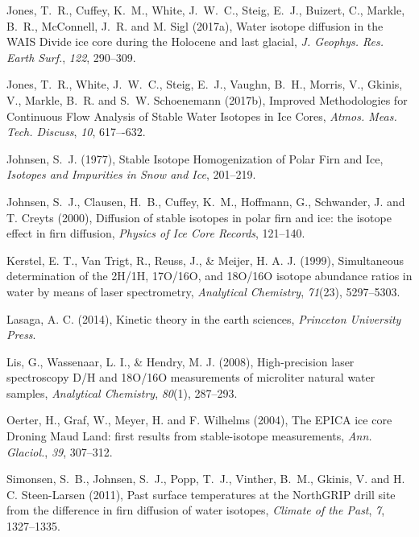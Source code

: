 \documentclass[draft, jgrga]{AGUTeX}
\begin{document}
\begin{article}
\begin{thebibliography}{}
Jones, T.~R., Cuffey, K.~M., White, J.~W.~C., Steig, E.~J., Buizert, C.,
Markle, B.~R., McConnell, J.~R. and M. Sigl (2017a),
{Water isotope diffusion in the WAIS Divide ice core
	during the Holocene and last glacial},
\textit{J. Geophys. Res. Earth Surf.}, \textit{122}, 290–309.

Jones, T.~R., White, J.~W.~C., Steig, E.~J., Vaughn, B.~H., Morris, V.,
Gkinis, V., Markle, B.~R. and S.~W. Schoenemann (2017b),
{Improved Methodologies for Continuous Flow Analysis of Stable
Water Isotopes in Ice Cores},
\textit{Atmos. Meas. Tech. Discuss}, \textit{10}, 617–-632.

Johnsen, S.~J. (1977),
{Stable Isotope Homogenization of Polar Firn and Ice},
\textit{Isotopes and Impurities in Snow and Ice}, 201--219.

Johnsen, S.~J., Clausen, H.~B., Cuffey, K.~M., Hoffmann, G., Schwander, J. and T. Creyts (2000),
{Diffusion of stable isotopes in polar firn and ice: the isotope effect in firn diffusion},
\textit{Physics of Ice Core Records}, 121--140.

Kerstel, E. T., Van Trigt, R., Reuss, J., & Meijer, H. A. J. (1999),
{Simultaneous determination of the 2H/1H, 17O/16O, and 18O/16O isotope abundance ratios in water by means of laser spectrometry},
\textit{Analytical Chemistry}, \textit{71}(23), 5297--5303.

Lasaga, A. C. (2014),
{Kinetic theory in the earth sciences},
\textit{Princeton University Press}.

Lis, G., Wassenaar, L. I., & Hendry, M. J. (2008),
{High-precision laser spectroscopy D/H and 18O/16O measurements of microliter natural water samples},
\textit{Analytical Chemistry}, \textit{80}(1), 287--293.

Oerter, H., Graf, W., Meyer, H. and F. Wilhelms (2004),
{The EPICA ice core Droning Maud Land: first results from stable-isotope measurements},
\textit{Ann. Glaciol.}, \textit{39}, 307--312.

Simonsen, S.~B., Johnsen, S.~J., Popp, T.~J., Vinther, B.~M., Gkinis, V. and H. C. Steen-Larsen (2011),
{Past surface temperatures at the NorthGRIP drill site from the difference in firn diffusion of water isotopes},
\textit{Climate of the Past}, \textit{7}, 1327--1335.


\end{thebibliography}
\end{article}
\end{document}
